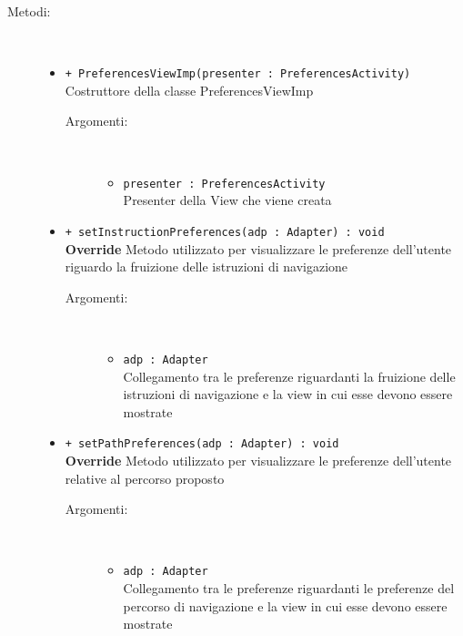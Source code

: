 \documentclass[../DefinizioneDiProdotto.tex]{subfiles}
\begin{document}
\begin{description}
\begin{itemize}
	\end{itemize}
	\item[Metodi:] \
	\begin{itemize}
		\item \texttt{+ PreferencesViewImp(presenter : PreferencesActivity)}\\
		Costruttore della classe PreferencesViewImp
		\begin{description}
			\item[Argomenti:] \
			\begin{itemize}
				\item \texttt{presenter : PreferencesActivity}\\
				Presenter della View che viene creata\end{itemize}
		\end{description}
		\item \texttt{+ setInstructionPreferences(adp : Adapter) : void}\\
		\textbf{Override} Metodo utilizzato per visualizzare le preferenze dell'utente riguardo la fruizione delle istruzioni di navigazione
		\begin{description}
			\item[Argomenti:] \
			\begin{itemize}
				\item \texttt{adp : Adapter}\\
				Collegamento tra le preferenze riguardanti la fruizione delle istruzioni di navigazione e la view in cui esse devono essere mostrate\end{itemize}
		\end{description}
		\item \texttt{+ setPathPreferences(adp : Adapter) : void}\\
		\textbf{Override} Metodo utilizzato per visualizzare le preferenze dell'utente relative al percorso proposto
		\begin{description}
			\item[Argomenti:] \
			\begin{itemize}
				\item \texttt{adp : Adapter}\\
				Collegamento tra le preferenze riguardanti le preferenze del percorso di navigazione e la view in cui esse devono essere mostrate\end{itemize}
		\end{description}
	\end{itemize}
\end{description}
\end{document}
